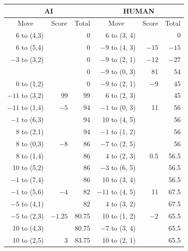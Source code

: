 \begin{appendices}
\begingroup
\renewcommand\arraystretch{0.75}
\begin{longtable}[H]{rrrrrr}
    \hline
    \multicolumn{3}{c}{AI}       & \multicolumn{3}{c}{HUMAN}     \\ \hline
    \multicolumn{1}{c}{Move}         & \multicolumn{1}{c}{Score} & \multicolumn{1}{c}{Total} & \multicolumn{1}{c}{Move}         & \multicolumn{1}{c}{Score} & \multicolumn{1}{c}{Total} \\ \hline
      6 to (4,3) &      &  0    &   6 to (3, 4) &      &  0    \\ \hline
      6 to (5,4) &      &  0    &  $-9$ to (4, 3) & $-15$   & $-15$   \\ \hline
     $-3$ to (3,2) &      &  0    &  $-9$ to (2, 1) & $-12$   & $-27$   \\ \hline
                 &      &  0    &  $-9$ to (0, 3) &  81   &  54   \\ \hline
      0 to (1,2) &      &  0    &  $-9$ to (2, 1) &  $-9$    & 45    \\ \hline
    $-11$ to (3,2) &  99   &  99   &   6 to (2, 3) &      &  45    \\ \hline
    $-11$ to (1,4) &  $-5$  &  94  &  $-1$ to (0, 3) &  11   &  56    \\ \hline
     $-1$ to (6,3) &      &  94  &  10 to (4, 5) &      &  56    \\ \hline
      8 to (2,1) &      &  94  &  $-1$ to (1, 2) &      &  56    \\ \hline
      8 to (0,3) &  $-8$   &  86   &  $-7$ to (2, 5) &      &  56    \\ \hline
      8 to (1,4) &      &  86   &   4 to (2, 3) &  0.5  &  56.5  \\ \hline
     10 to (5,2) &      &  86   &  $-3$ to (6, 5) &      &  56.5  \\ \hline
    $-1$ to (7,4) &      &  86   &  10 to (3, 4) &      &  56.5   \\ \hline
    $-1$ to (5,6) &  $-4$   &  82   & $-11$ to (4, 5) &  11   &  67.5    \\ \hline
    $-5$ to (4,1) &      &  82   &   4 to (3, 2) &      &  67.5    \\ \hline
    $-5$ to (2,3) &  $-1.25$  &  80.75    &  10 to (1, 2) &  $-2$    &  65.5    \\ \hline
     10 to (4,3) &      &  80.75    &  $-7$ to (3, 4) &      &  65.5    \\ \hline
     10 to (2,5) &  3    &  83.75    &  10 to (2, 1) &      &  65.5    \\ \hline

\end{longtable}
\end{appendices}
